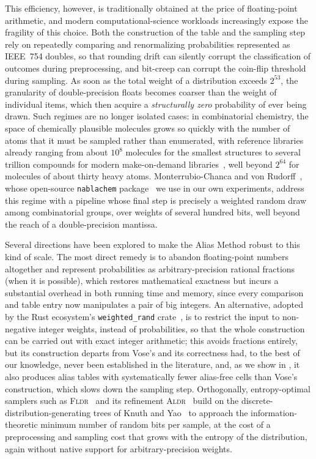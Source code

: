 This efficiency, however, is traditionally obtained at the price of floating-point arithmetic, and modern
computational-science workloads increasingly expose the fragility of this choice. Both the construction of
the table and the sampling step rely on repeatedly comparing and renormalizing probabilities represented as
IEEE~754 doubles, so that rounding drift can silently corrupt the classification of outcomes during
preprocessing, and bit-creep can corrupt the coin-flip threshold during sampling. As soon as the total
weight of a distribution exceeds $2^{53}$, the granularity of double-precision floats becomes coarser than
the weight of individual items, which then acquire a \emph{structurally zero} probability of ever being
drawn. Such regimes are no longer isolated cases: in combinatorial chemistry, the space of chemically
plausible molecules grows so quickly with the number of atoms that it must be sampled rather than
enumerated, with reference libraries already ranging from about $10^{8}$ molecules for the smallest
structures to several trillion compounds for modern make-on-demand libraries~\cite{SSHL26}, well beyond
$2^{64}$ for molecules of about thirty heavy atoms. Monterrubio-Chanca and von Rudorff~\cite{MR25}, whose
open-source \texttt{nablachem} package~\cite{nablachem} we use in our own experiments, address this regime
with a pipeline whose final step is precisely a weighted random draw among combinatorial groups, over
weights of several hundred bits, well beyond the reach of a double-precision mantissa.

Several directions have been explored to make the Alias Method robust to this kind of scale. The most
direct remedy is to abandon floating-point numbers altogether and represent probabilities as
arbitrary-precision rational fractions (when it is possible), which restores mathematical exactness but incurs a substantial
overhead in both running time and memory, since every comparison and table entry now manipulates a pair of
big integers. An alternative, adopted by the Rust ecosystem's \texttt{weighted\_rand} crate~\cite{Rust25},
is to restrict the input to non-negative integer weights, instead of probabilities, so that the whole construction can be carried out
with exact integer arithmetic; this avoids fractions entirely, but its construction departs from Vose's and its correctness had, to the best
of our knowledge, never been established in the literature, and, as we show in , it also produces
alias tables with systematically fewer alias-free cells than Vose's construction, which slows down the
sampling step. Orthogonally, entropy-optimal samplers such as \textsc{Fldr}~\cite{SFRM19} and its
refinement \textsc{Aldr}~\cite{DS26} build on the discrete-distribution-generating trees of Knuth and
Yao~\cite{KY76} to approach the information-theoretic minimum number of random bits per sample, at the cost
of a preprocessing and sampling cost that grows with the entropy of the distribution, again without native
support for arbitrary-precision weights.

